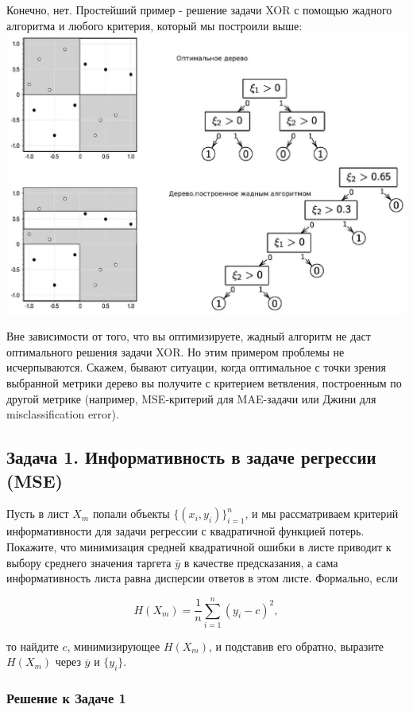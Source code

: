 Конечно, нет. Простейший пример - решение задачи XOR с помощью жадного алгоритма и любого критерия, который мы построили выше:\\
\includegraphics[width=\textwidth]{chapters/logical/images/2024_12_13_74602cb5a186ed81f4bcg-8.jpg}

Вне зависимости от того, что вы оптимизируете, жадный алгоритм не даст оптимального решения задачи XOR. Но этим примером проблемы не исчерпываются. Скажем, бывают ситуации, когда оптимальное с точки зрения выбранной метрики дерево вы получите с критерием ветвления, построенным по другой метрике (например, MSE-критерий для MAE-задачи или Джини для misclassification error).


\subsection*{Задача 1. Информативность в задаче регрессии (MSE)}

Пусть в лист \(X_m\) попали объекты \(\{(x_i, y_i)\}_{i=1}^n\), и мы рассматриваем критерий информативности для задачи регрессии с квадратичной функцией потерь. Покажите, что минимизация средней квадратичной ошибки в листе приводит к выбору среднего значения таргета \(\overline{y}\) в качестве предсказания, а сама информативность листа равна дисперсии ответов в этом листе. Формально, если

\[
    H(X_m) = \frac{1}{n} \sum_{i=1}^n (y_i - c)^2,
\]

то найдите \(c\), минимизирующее \(H(X_m)\), и подставив его обратно, выразите \(H(X_m)\) через \(\overline{y}\) и \(\{y_i\}\).

\subsubsection*{Решение к Задаче 1}

